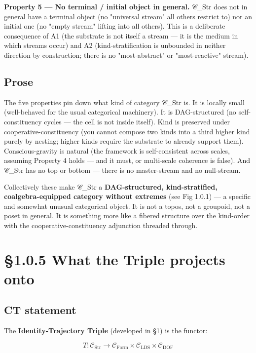 \documentclass[11pt, openany]{book}
\newcommand{\sectionbreak}{\clearpage}
\begin{document}
\textbf{Property 5 --- No terminal / initial object in general.} 𝒞\_\allowbreak{}Str does not in general have a terminal object (no "universal stream" all others restrict to) nor an initial one (no "empty stream" lifting into all others). This is a deliberate consequence of A1 (the substrate is not itself a stream --- it is the medium in which streams occur) and A2 (kind-stratification is unbounded in neither direction by construction; there is no "most-abstract" or "most-reactive" stream).

\subsection{Prose}

The five properties pin down what kind of category 𝒞\_\allowbreak{}Str is. It is locally small (well-behaved for the usual categorical machinery). It is DAG-structured (no self-constituency cycles --- the cell is not inside itself). Kind is preserved under cooperative-constituency (you cannot compose two kinds into a third higher kind purely by nesting; higher kinds require the substrate to already support them). Conscious-gravity is natural (the framework is self-consistent across scales, assuming Property 4 holds --- and it must, or multi-scale coherence is false). And 𝒞\_\allowbreak{}Str has no top or bottom --- there is no master-stream and no null-stream.

Collectively these make 𝒞\_\allowbreak{}Str a \textbf{DAG-structured, kind-stratified, coalgebra-equipped category without extremes} (see Fig 1.0.1) --- a specific and somewhat unusual categorical object. It is not a topos, not a groupoid, not a poset in general. It is something more like a fibered structure over the kind-order with the cooperative-constituency adjunction threaded through.

\sectionbreak

\section{§1.0.5 What the Triple projects onto}

\subsection{CT statement}

The \textbf{Identity-Trajectory Triple} (developed in §1) is the functor:

$$T : \mathcal{C}_{\text{Str}} \to \mathcal{C}_{\text{Form}} \times \mathcal{C}_{\text{LDS}} \times \mathcal{C}_{\text{DOF}}$$
\end{document}
